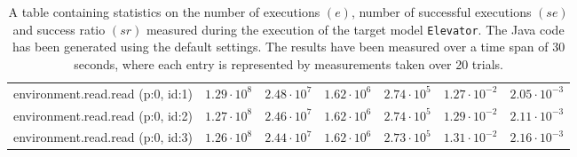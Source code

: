 \begin{table}[htbp]
{\begin{tabular}{lrrrrrr}
\hspace{3mm}environment.read.read (p:0, id:1) & $1.29 \cdot 10^{8}$ & $2.48 \cdot 10^{7}$ & $1.62 \cdot 10^{6}$ & $2.74 \cdot 10^{5}$ & $1.27 \cdot 10^{-2}$ & $2.05 \cdot 10^{-3}$ \\
\hspace{3mm}environment.read.read (p:0, id:2) & $1.27 \cdot 10^{8}$ & $2.46 \cdot 10^{7}$ & $1.62 \cdot 10^{6}$ & $2.74 \cdot 10^{5}$ & $1.29 \cdot 10^{-2}$ & $2.11 \cdot 10^{-3}$ \\
\hspace{3mm}environment.read.read (p:0, id:3) & $1.26 \cdot 10^{8}$ & $2.44 \cdot 10^{7}$ & $1.62 \cdot 10^{6}$ & $2.73 \cdot 10^{5}$ & $1.31 \cdot 10^{-2}$ & $2.16 \cdot 10^{-3}$ \\
\bottomrule
\end{tabular}
}
\caption{A table containing statistics on the number of executions $(e)$, number of successful executions $(se)$ and success ratio $(sr)$ measured during the execution of the target model \texttt{Elevator}. The Java code has been generated using the default settings. The results have been measured over a time span of 30 seconds, where each entry is represented by measurements taken over 20 trials.}
\label{table:frequency_results_elevator_default}
\end{table}